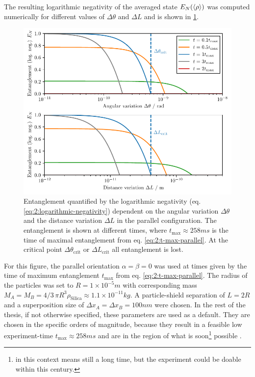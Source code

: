 The resulting logarithmic negativity of the averaged state $E_N(\left\langle\rho\right\rangle)$ was computed numerically for different values of $\Delta \theta$ and $\Delta L$ and is shown in \cref{fig:4:EN-delta-theta}.
\begin{figure}[!htb]
  \centering
  \includegraphics[width=\textwidth]{./../figures/theta-variance/EN-deltaTheta-deltaL.pdf}
  \caption{Entanglement quantified by the logarithmic negativity (eq. \eqref{eq:2:logarithmic-negativity}) dependent on the angular variation $\Delta\theta$ and the distance variation $\Delta L$ in the parallel configuration. The entanglement is shown at different times, where $t_\mathrm{max} \approx 258\si{ms}$ is the time of maximal entanglement from eq. \eqref{eq:2:t-max-parallel}. At the critical point $\Delta \theta_\mathrm{crit}$ or $\Delta L_\mathrm{crit}$ all entanglement is lost.}
  \label{fig:4:EN-delta-theta}
\end{figure}
For this figure, the parallel orientation $\alpha = \beta = 0$ was used at times given by the time of maximum entanglement $t_\mathrm{max}$ from eq. \eqref{eq:2:t-max-parallel}.
The radius of the particles was set to $R=1\times 10^{-5}\si{m}$ with corresponding mass $M_A = M_B = 4/3\, \pi R^3 \rho_\mathrm{Silica} \approx 1.1\times 10^{-11}\si{kg}$.
A particle-shield separation of $L=2R$ and a superposition size of $\Delta x_A = \Delta x_B = 100\si{nm}$ were chosen.
In the rest of the thesis, if not otherwise specified, these parameters are used as a default.
They are chosen in the specific orders of magnitude, because they result in a feasible low experiment-time $t_\mathrm{max}\approx 258\si{ms}$ and are in the region of what is soon\footnote{ in this context means still a long time, but the experiment could be doable within this century.} possible \cite{Aspelmeyer_2024}.
